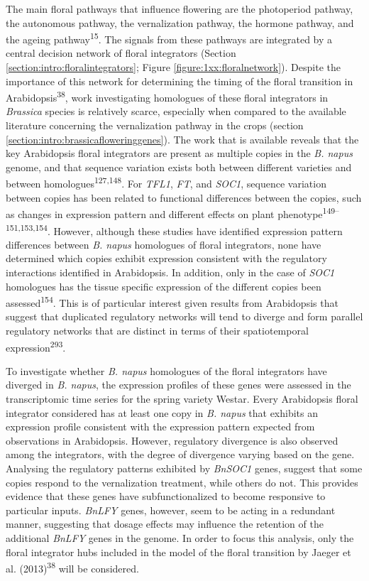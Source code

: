 \documentclass[12pt,]{book}
\begin{document}
The main floral pathways that influence flowering are the photoperiod
pathway, the autonomous pathway, the vernalization pathway, the hormone
pathway, and the ageing pathway\textsuperscript{15}. The signals from
these pathways are integrated by a central decision network of floral
integrators (Section \ref{section:intro:floralintegrators}; Figure
\ref{figure:1xx:floralnetwork}). Despite the importance of this network
for determining the timing of the floral transition in
Arabidopsis\textsuperscript{38}, work investigating homologues of these
floral integrators in \emph{Brassica} species is relatively scarce,
especially when compared to the available literature concerning the
vernalization pathway in the crops (section
\ref{section:intro:brassicafloweringgenes}). The work that is available
reveals that the key Arabidopsis floral integrators are present as
multiple copies in the \emph{B. napus} genome, and that sequence
variation exists both between different varieties and between
homologues\textsuperscript{127,148}. For \emph{TFL1}, \emph{FT}, and
\emph{SOC1}, sequence variation between copies has been related to
functional differences between the copies, such as changes in expression
pattern and different effects on plant
phenotype\textsuperscript{149--151,153,154}. However, although these
studies have identified expression pattern differences between \emph{B.
napus} homologues of floral integrators, none have determined which
copies exhibit expression consistent with the regulatory interactions
identified in Arabidopsis. In addition, only in the case of \emph{SOC1}
homologues has the tissue specific expression of the different copies
been assessed\textsuperscript{154}. This is of particular interest given
results from Arabidopsis that suggest that duplicated regulatory
networks will tend to diverge and form parallel regulatory networks that
are distinct in terms of their spatiotemporal
expression\textsuperscript{293}.

To investigate whether \emph{B. napus} homologues of the floral
integrators have diverged in \emph{B. napus}, the expression profiles of
these genes were assessed in the transcriptomic time series for the
spring variety Westar. Every Arabidopsis floral integrator considered
has at least one copy in \emph{B. napus} that exhibits an expression
profile consistent with the expression pattern expected from
observations in Arabidopsis. However, regulatory divergence is also
observed among the integrators, with the degree of divergence varying
based on the gene. Analysing the regulatory patterns exhibited by
\emph{BnSOC1} genes, suggest that some copies respond to the
vernalization treatment, while others do not. This provides evidence
that these genes have subfunctionalized to become responsive to
particular inputs. \emph{BnLFY} genes, however, seem to be acting in a
redundant manner, suggesting that dosage effects may influence the
retention of the additional \emph{BnLFY} genes in the genome. In order
to focus this analysis, only the floral integrator hubs included in the
model of the floral transition by Jaeger et al.
(2013)\textsuperscript{38} will be considered.
\end{document}
